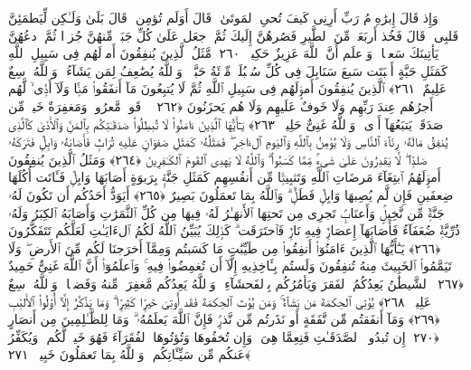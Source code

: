  وَإِذ قَالَ إِبرَٰهِۦمُ رَبِّ أَرِنِى كَيفَ تُحىِ ٱلمَوتَىٰ ۖ قَالَ أَوَلَم تُؤمِن ۖ قَالَ بَلَىٰ وَلَـٰكِن لِّيَطمَئِنَّ قَلبِى ۖ قَالَ فَخُذ أَربَعَةًۭ مِّنَ ٱلطَّيرِ فَصُرهُنَّ إِلَيكَ ثُمَّ ٱجعَل عَلَىٰ كُلِّ جَبَلٍۢ مِّنهُنَّ جُزءًۭا ثُمَّ ٱدعُهُنَّ يَأتِينَكَ سَعيًۭا ۚ وَٱعلَم أَنَّ ٱللَّهَ عَزِيزٌ حَكِيمٌۭ ﴿٢٦٠﴾
 مَّثَلُ ٱلَّذِينَ يُنفِقُونَ أَموَٟلَهُم فِى سَبِيلِ ٱللَّهِ كَمَثَلِ حَبَّةٍ أَنۢبَتَت سَبعَ سَنَابِلَ فِى كُلِّ سُنۢبُلَةٍۢ مِّا۟ئَةُ حَبَّةٍۢ ۗ وَٱللَّهُ يُضَٰعِفُ لِمَن يَشَآءُ ۗ وَٱللَّهُ وَٟسِعٌ عَلِيمٌ ﴿٢٦١﴾
 ٱلَّذِينَ يُنفِقُونَ أَموَٟلَهُم فِى سَبِيلِ ٱللَّهِ ثُمَّ لَا يُتبِعُونَ مَآ أَنفَقُوا۟ مَنًّۭا وَلَآ أَذًۭى ۙ لَّهُم أَجرُهُم عِندَ رَبِّهِم وَلَا خَوفٌ عَلَيهِم وَلَا هُم يَحزَنُونَ ﴿٢٦٢﴾
 ۞ قَولٌۭ مَّعرُوفٌۭ وَمَغفِرَةٌ خَيرٌۭ مِّن صَدَقَةٍۢ يَتبَعُهَآ أَذًۭى ۗ وَٱللَّهُ غَنِىٌّ حَلِيمٌۭ ﴿٢٦٣﴾
 يَـٰٓأَيُّهَا ٱلَّذِينَ ءَامَنُوا۟ لَا تُبطِلُوا۟ صَدَقَـٰتِكُم بِٱلمَنِّ وَٱلأَذَىٰ كَٱلَّذِى يُنفِقُ مَالَهُۥ رِئَآءَ ٱلنَّاسِ وَلَا يُؤمِنُ بِٱللَّهِ وَٱليَومِ ٱلءَاخِرِ ۖ فَمَثَلُهُۥ كَمَثَلِ صَفوَانٍ عَلَيهِ تُرَابٌۭ فَأَصَابَهُۥ وَابِلٌۭ فَتَرَكَهُۥ صَلدًۭا ۖ لَّا يَقدِرُونَ عَلَىٰ شَىءٍۢ مِّمَّا كَسَبُوا۟ ۗ وَٱللَّهُ لَا يَهدِى ٱلقَومَ ٱلكَـٰفِرِينَ ﴿٢٦٤﴾
 وَمَثَلُ ٱلَّذِينَ يُنفِقُونَ أَموَٟلَهُمُ ٱبتِغَآءَ مَرضَاتِ ٱللَّهِ وَتَثبِيتًۭا مِّن أَنفُسِهِم كَمَثَلِ جَنَّةٍۭ بِرَبوَةٍ أَصَابَهَا وَابِلٌۭ فَـَٔاتَت أُكُلَهَا ضِعفَينِ فَإِن لَّم يُصِبهَا وَابِلٌۭ فَطَلٌّۭ ۗ وَٱللَّهُ بِمَا تَعمَلُونَ بَصِيرٌ ﴿٢٦٥﴾
 أَيَوَدُّ أَحَدُكُم أَن تَكُونَ لَهُۥ جَنَّةٌۭ مِّن نَّخِيلٍۢ وَأَعنَابٍۢ تَجرِى مِن تَحتِهَا ٱلأَنهَـٰرُ لَهُۥ فِيهَا مِن كُلِّ ٱلثَّمَرَٰتِ وَأَصَابَهُ ٱلكِبَرُ وَلَهُۥ ذُرِّيَّةٌۭ ضُعَفَآءُ فَأَصَابَهَآ إِعصَارٌۭ فِيهِ نَارٌۭ فَٱحتَرَقَت ۗ كَذَٟلِكَ يُبَيِّنُ ٱللَّهُ لَكُمُ ٱلءَايَـٰتِ لَعَلَّكُم تَتَفَكَّرُونَ ﴿٢٦٦﴾
 يَـٰٓأَيُّهَا ٱلَّذِينَ ءَامَنُوٓا۟ أَنفِقُوا۟ مِن طَيِّبَٰتِ مَا كَسَبتُم وَمِمَّآ أَخرَجنَا لَكُم مِّنَ ٱلأَرضِ ۖ وَلَا تَيَمَّمُوا۟ ٱلخَبِيثَ مِنهُ تُنفِقُونَ وَلَستُم بِـَٔاخِذِيهِ إِلَّآ أَن تُغمِضُوا۟ فِيهِ ۚ وَٱعلَمُوٓا۟ أَنَّ ٱللَّهَ غَنِىٌّ حَمِيدٌ ﴿٢٦٧﴾
 ٱلشَّيطَٰنُ يَعِدُكُمُ ٱلفَقرَ وَيَأمُرُكُم بِٱلفَحشَآءِ ۖ وَٱللَّهُ يَعِدُكُم مَّغفِرَةًۭ مِّنهُ وَفَضلًۭا ۗ وَٱللَّهُ وَٟسِعٌ عَلِيمٌۭ ﴿٢٦٨﴾
 يُؤتِى ٱلحِكمَةَ مَن يَشَآءُ ۚ وَمَن يُؤتَ ٱلحِكمَةَ فَقَد أُوتِىَ خَيرًۭا كَثِيرًۭا ۗ وَمَا يَذَّكَّرُ إِلَّآ أُو۟لُوا۟ ٱلأَلبَٰبِ ﴿٢٦٩﴾
 وَمَآ أَنفَقتُم مِّن نَّفَقَةٍ أَو نَذَرتُم مِّن نَّذرٍۢ فَإِنَّ ٱللَّهَ يَعلَمُهُۥ ۗ وَمَا لِلظَّـٰلِمِينَ مِن أَنصَارٍ ﴿٢٧٠﴾
 إِن تُبدُوا۟ ٱلصَّدَقَـٰتِ فَنِعِمَّا هِىَ ۖ وَإِن تُخفُوهَا وَتُؤتُوهَا ٱلفُقَرَآءَ فَهُوَ خَيرٌۭ لَّكُم ۚ وَيُكَفِّرُ عَنكُم مِّن سَيِّـَٔاتِكُم ۗ وَٱللَّهُ بِمَا تَعمَلُونَ خَبِيرٌۭ ﴿٢٧١﴾
